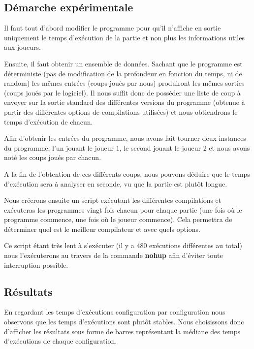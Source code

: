 \documentclass[
 aip,
 jmp,
 amsmath,amssymb,
 reprint
]{revtex4-1}
\begin{document}
\subsection{Démarche expérimentale}
Il faut tout d'abord modifier le programme pour qu'il n'affiche en sortie uniquement le temps d'exécution de la partie et non plus les informations utiles aux joueurs.\par
Ensuite, il faut obtenir un ensemble de données. Sachant que le programme est déterministe (pas de modification de la profondeur en fonction du temps, ni de random) les mêmes entrées (coups joués par nous) produiront les mêmes sorties (coups joués par le logiciel). Il nous suffit donc de posséder une liste de coup à envoyer sur la sortie standard des différentes versions du programme (obtenue à partir des différentes options de compilations utilisées) et nous obtiendrons le temps d'exécution de chacun.\par
Afin d'obtenir les entrées du programme, nous avons fait tourner deux instances du programme, l'un jouant le joueur 1, le second jouant le joueur 2 et nous avons noté les coups joués par chacun.\par
A la fin de l'obtention de ces différents coups, nous pouvons déduire que le temps d'exécution sera à analyser en seconde, vu que la partie est plutôt longue.\par
Nous créerons ensuite un script exécutant les différentes compilations et exécuteras les programmes vingt fois chacun pour chaque partie (une fois où le programme commence, une fois où le joueur commence). Cela permettra de déterminer quel est le meilleur compilateur et avec quels options.\par
Ce script étant très lent à s'exécuter (il y a 480 exécutions différentes au total) nous l'exécuterons au travers de la commande \textbf{nohup} afin d'éviter toute interruption possible.

\subsection{Résultats}
En regardant les temps d'exécutions configuration par configuration nous observons que les temps d'exécutions sont plutôt stables. Nous choisissons donc d'afficher les résultats sous forme de barres représentant la médiane des temps d'exécutions de chaque configuration.
\end{document}

